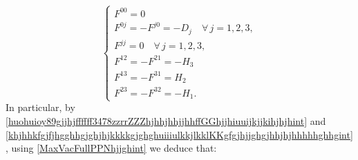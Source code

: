 \documentclass{article}
\theoremstyle{definition}
\theoremstyle{remark}
\newcommand{\er}{\eqref}
\newcommand{\er}{\eqref}
\begin{document}
\begin{equation}\label{khjhhkfgjfjhgghhgjghjhjkkkkgjghghuiiiulkkjlkklKKgfgjhjjghgjhhjhjhhhhhghhgint}
\begin{cases}
F^{00}=0
\\
F^{0j}=-F^{j0}=-D_j\quad\forall\, j=1,2,3,\\
F^{jj}=0 \quad\forall\, j=1,2,3,\\
F^{12}=-F^{21}=-H_3\\
F^{13}=-F^{31}=H_2\\
F^{23}=-F^{32}=-H_1.
\end{cases}
\end{equation}
In particular, by
\er{huohuioy89gjjhjffffff3478zzrrZZZhjhhjhhjjhhffGGhjjhiuuijkjjkihjhjhint}
and
\er{khjhhkfgjfjhgghhgjghjhjkkkkgjghghuiiiulkkjlkklKKgfgjhjjghgjhhjhjhhhhhghhgint},
using \er{MaxVacFullPPNhjjghint} we deduce that:
%
%
%
\end{document}
